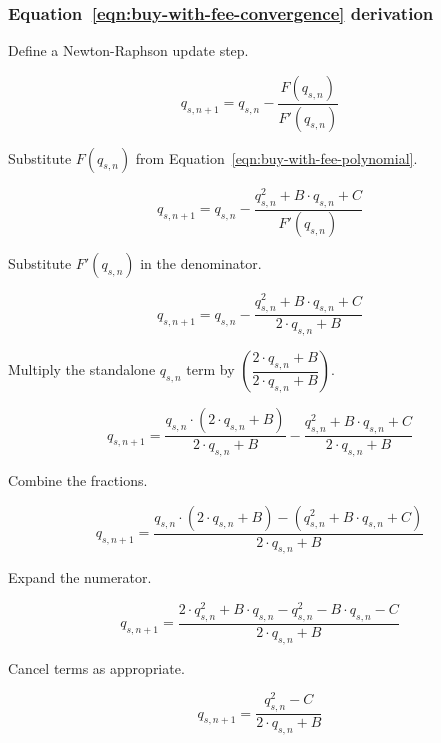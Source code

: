 \subsubsection{Equation~\ref{eqn:buy-with-fee-convergence} derivation}%
\label{sssec:equation-eqn-buy-with-fee-convergence-derivation}

Define a Newton-Raphson update step.

\begin{equation*}
	q_{s, n + 1} = q_{s, n} -\frac{F(q_{s, n})}{F'(q_{s, n})}
\end{equation*}

Substitute $F(q_{s, n})$ from Equation~\ref{eqn:buy-with-fee-polynomial}.

\begin{equation*}
	q_{s, n + 1} = q_{s, n} -\frac{q_{s, n}^2 + B \cdot q_{s, n} + C}{F'(q_{s, n})}
\end{equation*}

Substitute $F'(q_{s, n})$ in the denominator.

\begin{equation*}
	q_{s, n + 1} =
	q_{s, n} -\frac{q_{s, n}^2 + B \cdot q_{s, n} + C}{2 \cdot q_{s, n} + B}
\end{equation*}

Multiply the standalone $q_{s, n}$ term by
$\left(\dfrac{2 \cdot q_{s, n} + B}{2 \cdot q_{s, n} + B}\right)$.

\begin{equation*}
	q_{s, n + 1} = \frac{q_{s, n} \cdot (2 \cdot q_{s, n} + B)}{2 \cdot q_{s, n} + B} -
	\frac{q_{s, n}^2 + B \cdot q_{s, n} + C}{2 \cdot q_{s, n} + B}
\end{equation*}

Combine the fractions.

\begin{equation*}
	q_{s, n + 1} =
	\frac{q_{s, n} \cdot (2 \cdot q_{s, n} + B) - (q_{s, n}^2 + B \cdot q_{s, n} + C)}
	{2 \cdot q_{s, n} + B}
\end{equation*}

Expand the numerator.

\begin{equation*}
	q_{s, n + 1} =
	\frac{2 \cdot q_{s, n}^2 + B \cdot q_{s, n} - q_{s, n}^2 - B \cdot q_{s, n} - C}
	{2 \cdot q_{s, n} + B}
\end{equation*}

Cancel terms as appropriate.

\begin{equation*}
	q_{s, n + 1} = \frac{q_{s, n}^2 - C}{2 \cdot q_{s, n} + B}
\end{equation*}

